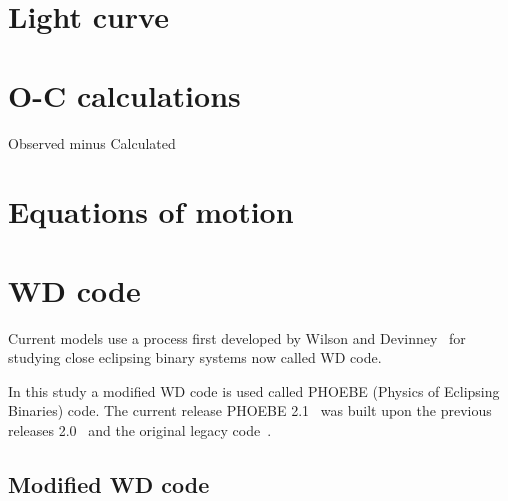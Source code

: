 \section{Light curve}

\section{O-C calculations}
Observed minus Calculated

\section{Equations of motion}


\section{WD code}
Current models use a process first developed by Wilson and Devinney~\cite{wilson_devinney_1971} for studying close eclipsing binary systems now 
called WD code.

In this study a modified WD code is used called PHOEBE (Physics of Eclipsing Binaries) code.
The current release PHOEBE 2.1~\cite{horvat_2018} was built upon the previous releases 2.0~\cite{prsa_2016}
and the original legacy code~\cite{prsa_2005}. 


\subsection{Modified WD code}



